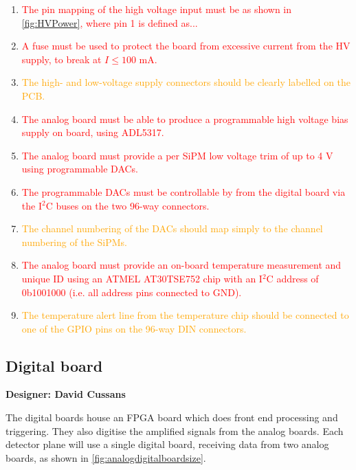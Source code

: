 \documentclass[a4paper]{article}
\newcommand{\must}[1]{\textcolor{red}{#1}}
\newcommand{\should}[1]{\textcolor{orange}{#1}}
\def\I2C{I$^2$C}
\begin{document}
\begin{enumerate}
    \item \must{The pin mapping of the high voltage input must be as shown in \cref{fig:HVPower}, where pin 1 is defined as...}
    \item \must{A fuse must be used to protect the board from excessive current from the HV supply, to break at $I \le 100$ mA.}
    \item \should{The high- and low-voltage supply connectors should be clearly labelled on the PCB.}
    \item \must{The analog board must be able to produce a programmable high voltage bias supply on board, using ADL5317.}
    \item \must{The analog board must provide a per SiPM low voltage trim of up to 4 V using programmable DACs.}
    \item \must{The programmable DACs must be controllable by from the digital board via the \I2C buses on the two 96-way connectors.}
    \item \should{The channel numbering of the DACs should map simply to the channel numbering of the SiPMs.}
    \item \must{The analog board must provide an on-board temperature measurement and unique ID using an ATMEL AT30TSE752 chip with an \I2C address of 0b1001000 (i.e. all address pins connected to GND).} 
    \item \should{The temperature alert line from the temperature chip should be connected to one of the GPIO pins on the 96-way DIN connectors.}
\end{enumerate}

\clearpage
\newpage

\subsection{Digital board}

{\bf Designer: David Cussans}

The digital boards house an FPGA board which does front end processing and triggering.
They also digitise the amplified signals from the analog boards.
Each detector plane will use a single digital board, receiving data from two analog boards, as shown in \cref{fig:analogdigitalboardsize}.


\end{document}
